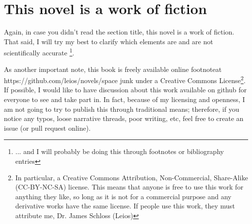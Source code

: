\chapter*{This novel is a work of fiction}

Again, in case you didn't read the section title, this novel is a work of fiction.
That said, I will try my best to clarify which elements are and are not scientifically accurate \footnote{... and I will probably be doing this through footnotes or bibliography entries}.

As another important note, this book is freely available online footnote{at https://github.com/leios/novels/space junk} under a Creative Commons License\footnote{In particular, a Creative Commons Attribution, Non-Commercial, Share-Alike (CC-BY-NC-SA) license. This means that anyone is free to use this work for anything they like, so long as it is not for a commercial purpose and any derivative works have the same license.
If people use this work, they must attribute me, Dr. James Schloss (Leios)}.
If possible, I would like to have discussion about this work available on github for everyone to see and take part in.
In fact, because of my licensing and openness, I am not going to try to publish this through traditional means; therefore, if you notice any typos, loose narrative threads, poor writing, etc, feel free to create an issue (or pull request online).


